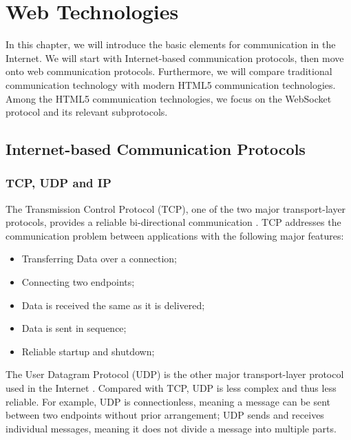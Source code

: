 \chapter{Web Technologies}
\label{chapter:WebTechnologies} 

In this chapter, we will introduce the basic elements for communication in the Internet. We will start with Internet-based communication protocols, then move onto web communication protocols. Furthermore, we will compare traditional communication technology with modern HTML5 communication technologies. Among the HTML5 communication technologies, we focus on the WebSocket protocol and its relevant subprotocols.

\section{Internet-based Communication Protocols}

\subsection{TCP, UDP and IP}
The Transmission Control Protocol (TCP), one of the two major transport-layer protocols, provides a reliable bi-directional communication \cite{comer2008computer}. TCP addresses the communication problem between applications with the following major features: 

\begin{itemize}
\setlength{\itemsep}{0pt}
\item Transferring Data over a connection;
\item Connecting two endpoints;
\item Data is received the same as it is delivered;
\item Data is sent in sequence;
\item Reliable startup and shutdown;
\end{itemize}

The User Datagram Protocol (UDP) is the other major transport-layer protocol used in the Internet \cite{comer2008computer}. Compared with TCP, UDP is less complex and thus less reliable. For example, UDP is connectionless, meaning a message can be sent between two endpoints without prior arrangement; UDP sends and receives individual messages, meaning it does not divide a message into multiple parts.

